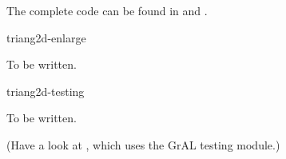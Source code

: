 The complete code can be found in 
and .

\begin{Label}{triang2d-enlarge}
\end{Label}

To be written.

\begin{Label}{triang2d-testing}
\end{Label}

To be written. 

(Have a look at ,
which uses the GrAL testing module.)